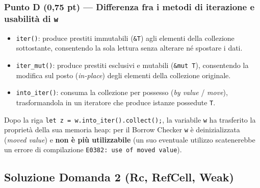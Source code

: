 \documentclass[11pt,a4paper]{article}
\begin{document}
\subsubsection*{Punto D (0,75 pt) --- Differenza fra i metodi di iterazione e usabilità di \texttt{w}}
\begin{itemize}[leftmargin=1.5em]
    \item \texttt{iter()}: produce prestiti immutabili (\texttt{\&T}) agli elementi della collezione sottostante, consentendo la sola lettura senza alterare né spostare i dati.
    \item \texttt{iter\_mut()}: produce prestiti esclusivi e mutabili (\texttt{\&mut T}), consentendo la modifica sul posto (\emph{in-place}) degli elementi della collezione originale.
    \item \texttt{into\_iter()}: consuma la collezione per possesso (\emph{by value} / \emph{move}), trasformandola in un iteratore che produce istanze possedute \texttt{T}.
\end{itemize}
Dopo la riga \texttt{let z = w.into\_iter().collect();}, la variabile \texttt{w} ha trasferito la proprietà della sua memoria heap: per il Borrow Checker \texttt{w} è deinizializzata (\emph{moved value}) e \textbf{non è più utilizzabile} (un suo eventuale utilizzo scatenerebbe un errore di compilazione \texttt{E0382: use of moved value}).

\newpage
\subsection{Soluzione Domanda 2 (Rc, RefCell, Weak)}
\end{document}
